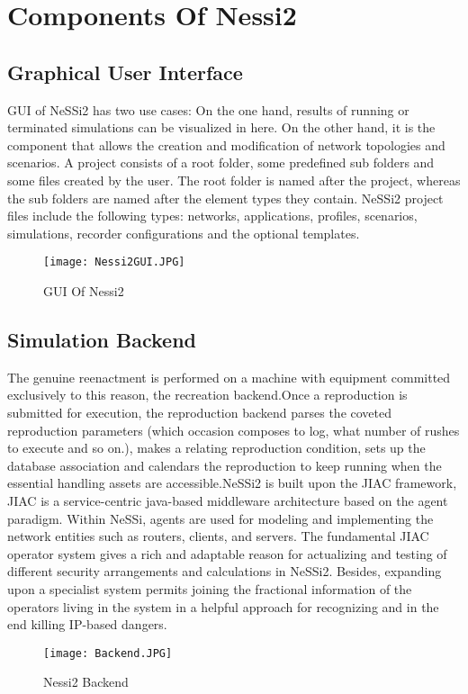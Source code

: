 \section{Components Of Nessi2}
\subsection{Graphical User Interface}

GUI of NeSSi2 has two use cases: On the one hand, results of running or terminated simulations can be visualized in here. On the other hand,
it is the component that allows the creation and modification of network topologies and scenarios.
A project consists of a root folder, some predefined sub folders and some files created by the user. The root folder is named after the project, whereas the sub folders are named after the element types they contain. NeSSi2 project files include the following types: networks, applications, profiles, scenarios, simulations, recorder configurations and the optional templates.
\begin{figure}[h]
	\centering
	\texttt{[image: Nessi2GUI.JPG]}
	\caption{GUI Of Nessi2}
	\label{fig:netwok}
\end{figure}

\newpage
\subsection{Simulation Backend}
The genuine reenactment is performed on a machine with equipment committed exclusively to this reason, the recreation backend.Once a reproduction is submitted for execution, the reproduction backend parses the coveted reproduction parameters (which occasion composes to log, what number of rushes to execute and so on.), makes a relating reproduction condition, sets up the database association and calendars the reproduction to keep running when the essential handling assets are accessible.NeSSi2 is built upon the JIAC framework, JIAC is a service-centric java-based middleware architecture based on the agent paradigm. Within NeSSi, agents are used for modeling and implementing the network entities such as routers, clients, and servers. The fundamental JIAC operator system gives a rich and adaptable reason
for actualizing and testing of different security arrangements and calculations in NeSSi2. Besides, expanding upon a specialist system permits joining the fractional information of the operators living in the system in a helpful approach for recognizing and in the end killing IP-based dangers.
\begin{figure}[h]
	\centering
		\texttt{[image: Backend.JPG]}
	\caption{Nessi2 Backend}
	\label{fig:backend}
\end{figure}
\newpage
